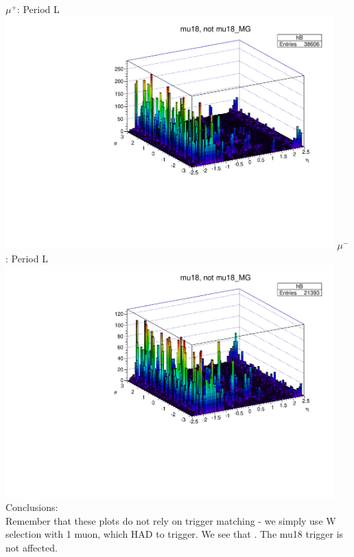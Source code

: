  {
\colb[T]
$\mu^+$: Period L
\centering
\includegraphics[width=0.95\textwidth]{dates/20130306/figures/mu18/dump_MG_dataL_w_POS.dat__MUID_NOT_MG}
$\mu^-$: Period L
\centering
\includegraphics[width=0.95\textwidth]{dates/20130306/figures/mu18/dump_MG_dataL_w_NEG.dat__MUID_NOT_MG}
\cole
}
 {
  Conclusions: \\
  Remember that these plots do not rely on trigger matching - we simply use W selection with 1 muon, which HAD to trigger.
  We see that . The mu18 trigger is not affected.
}


